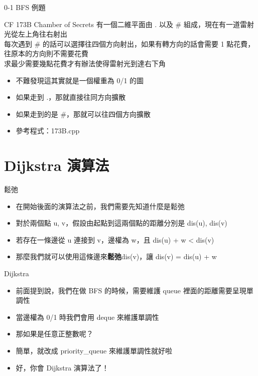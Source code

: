 \documentclass[aspectratio=169]{beamer}
\begin{document}
    \begin{frame}{0-1 BFS 例題}
        \begin{block}{CF 173B Chamber of Secrets}
            有一個二維平面由 . 以及 \# 組成，現在有一道雷射光從左上角往右射出\\
            每次遇到 \# 的話可以選擇往四個方向射出，如果有轉方向的話會需要 1 點花費，往原本的方向則不需要花費\\
            求最少需要幾點花費才有辦法使得雷射光到達右下角
        \end{block}

        \begin{itemize}
            \item<2-> 不難發現這其實就是一個權重為 0/1 的圖
            \item<3-> 如果走到 .，那就直接往同方向擴散
            \item<3-> 如果走到的是 \#，那就可以往四個方向擴散
            \item<3-> 參考程式：173B.cpp
        \end{itemize}
    \end{frame}

    \section{Dijkstra 演算法}

    \begin{frame}{鬆弛}
        \begin{itemize}
            \item<1-> 在開始後面的演算法之前，我們需要先知道什麼是鬆弛
            \item<2-> 對於兩個點 u, v，假設由起點到這兩個點的距離分別是 dis(u), dis(v)
            \item<3-> 若存在一條邊從 u 連接到 v，邊權為 w，且 dis(u) + w < dis(v)
            \item<4-> 那麼我們就可以使用這條邊來\textbf{鬆弛}dis(v)，讓 dis(v) = dis(u) + w
        \end{itemize}
    \end{frame}

    \begin{frame}{Dijkstra}
        \begin{itemize}
            \item<1-> 前面提到說，我們在做 BFS 的時候，需要維護 queue 裡面的距離需要呈現單調性
            \item<2-> 當邊權為 0/1 時我們會用 deque 來維護單調性
            \item<3-> 那如果是任意正整數呢？
            \item<4-> 簡單，就改成 priority\_queue 來維護單調性就好啦
            \item<5-> 好，你會 Dijkstra 演算法了！
        \end{itemize}
    \end{frame}
\end{document}
